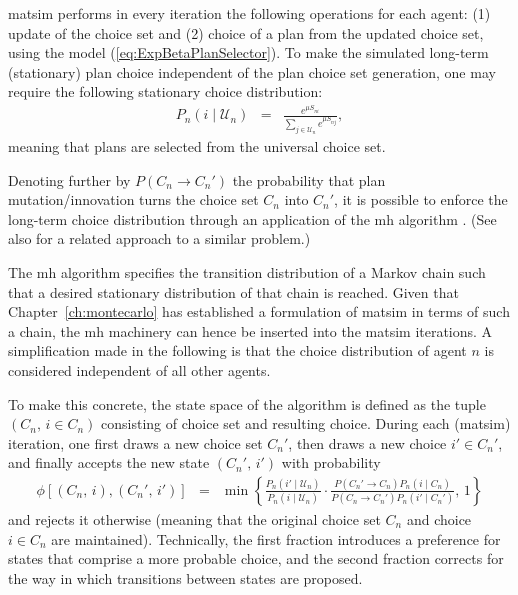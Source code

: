 \gls{matsim} performs in every iteration the following operations for each
agent: (1) update of the choice set and (2) choice of a plan from
the updated choice set, using the model (\ref{eq:ExpBetaPlanSelector}).
To make the simulated long-term (stationary) plan choice independent
of the plan choice set generation, one may require the following stationary
choice distribution:
\begin{eqnarray}
P_{n}(i\mid \mathcal{U}_n) & = & \frac{e^{\mu S_{ni}}}{\sum_{j\in \mathcal{U}_n}e^{\mu S_{nj}}},
\label{eq:global-choice-model}
\end{eqnarray}
meaning that plans are selected from the universal choice set.

Denoting further by $P(C_{n}\rightarrow C_{n}')$ the probability
that plan mutation/innovation turns the choice set $C_{n}$ into $C_{n}'$,
it is possible to enforce the long-term choice distribution 
through an application of the \gls{mh} algorithm \citep{hastings-1970}.
(See also \citet{floetteroed-2012b} for a related approach to a similar
problem.) 

The \gls{mh} algorithm specifies the transition distribution
of a Markov chain such that a desired stationary distribution of that
chain is reached. Given that Chapter~\ref{ch:montecarlo} has established
a formulation of \gls{matsim} in terms of such a chain, the \gls{mh} machinery can
hence be inserted into the \gls{matsim} iterations. A simplification made in
the following is that the choice distribution of agent $n$ is considered
independent of all other agents.

To make this concrete, the state space of the algorithm is defined as the tuple
$(C_{n},\, i\in C_{n})$ consisting of choice set and resulting choice.
During each (\gls{matsim}) iteration, one first draws a new choice set $C_{n}'$,
then draws a new choice $i'\in C_{n}'$, and finally accepts the new
state $(C_{n}',\, i')$ with probability
\begin{eqnarray}
\phi[(C_{n},\, i),(C_{n}',\, i')] 
& = & 
\min\left\{ 
\frac{{\displaystyle P_{n}(i'\mid \mathcal{U}_n)}}
{{\displaystyle P_{n}(i\mid \mathcal{U}_n)}}
\cdot
\frac{{P(C_{n}'\rightarrow C_{n})P_n(i\mid C_{n})}}
{{P(C_{n}\rightarrow C_{n}')P_n(i'\mid C_{n}')}}
,\,1\right\} 
\label{eq:accept-proba-1}
\end{eqnarray}
and rejects it otherwise (meaning that the original choice set $C_{n}$
and choice $i\in C_{n}$ are maintained).
Technically, the first fraction introduces a preference for states
that comprise a more probable choice, and the second
fraction corrects for the way in which transitions between states are
proposed.

